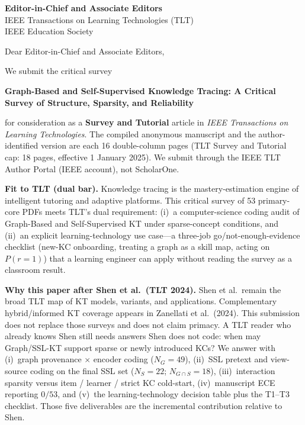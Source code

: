 \documentclass[11pt]{letter}
\date{November 25, 2026}
\begin{document}
\begin{letter}{
\textbf{Editor-in-Chief and Associate Editors}\\
IEEE Transactions on Learning Technologies (TLT)\\
IEEE Education Society
}

\opening{Dear Editor-in-Chief and Associate Editors,}

We submit the critical survey

\begin{center}
\textbf{Graph-Based and Self-Supervised Knowledge Tracing: A Critical Survey of Structure, Sparsity, and Reliability}
\end{center}

for consideration as a \textbf{Survey and Tutorial} article in \textit{IEEE Transactions on Learning Technologies}. The compiled anonymous manuscript and the author-identified version are each 16 double-column pages (TLT Survey and Tutorial cap: 18 pages, effective 1 January 2025). We submit through the IEEE TLT Author Portal (IEEE account), not ScholarOne.

\textbf{Fit to TLT (dual bar).} Knowledge tracing is the mastery-estimation engine of intelligent tutoring and adaptive platforms. This critical survey of 53 primary-core PDFs meets TLT's dual requirement: (i)~a computer-science coding audit of Graph-Based and Self-Supervised KT under sparse-concept conditions, and (ii)~an explicit learning-technology use case---a three-job go/not-enough-evidence checklist (new-KC onboarding, treating a graph as a skill map, acting on $P(r{=}1)$) that a learning engineer can apply without reading the survey as a classroom result.

\textbf{Why this paper after Shen et al.\ (TLT 2024).} Shen et al.\ remain the broad TLT map of KT models, variants, and applications. Complementary hybrid/informed KT coverage appears in Zanellati et al.\ (2024). This submission does not replace those surveys and does not claim primacy. A TLT reader who already knows Shen still needs answers Shen does not code: when may Graph/SSL-KT support sparse or newly introduced KCs? We answer with (i)~graph provenance $\times$ encoder coding ($N_G=49$), (ii)~SSL pretext and view-source coding on the final SSL set ($N_S=22$; $N_{G\cap S}=18$), (iii)~interaction sparsity versus item / learner / strict KC cold-start, (iv)~manuscript ECE reporting $0/53$, and (v)~the learning-technology decision table plus the T1--T3 checklist. Those five deliverables are the incremental contribution relative to Shen.


\end{letter}
\end{document}
